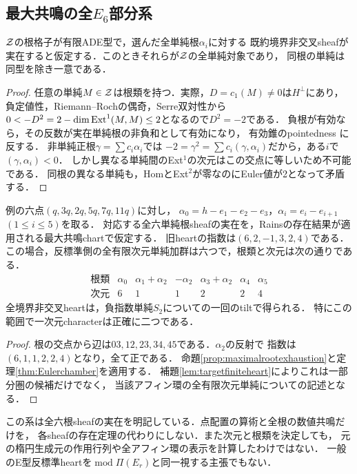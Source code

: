 \subsection{最大共鳴の全\texorpdfstring{$E_6$}{E6}部分系}
\begin{proposition}[全単純根が実在する場合の網羅性]\label{prop:maximalrootexhaustion}
$\mathcal Z$の根格子が有限ADE型で，選んだ全単純根$\alpha_i$に対する
既約境界非交叉sheafが実在すると仮定する．このときそれらが$\mathcal Z$の全単純対象であり，
同根の単純は同型を除き一意である．
\end{proposition}
\begin{proof}
任意の単純$M\in\mathcal Z$は根類を持つ．実際，$D=c_1(M)\ne0$は$H^\perp$にあり，
負定値性，Riemann--Rochの偶奇，Serre双対性から
$0<-D^2=2-\dim\operatorname{Ext}^1(M,M)\le2$となるので$D^2=-2$である．
負根が有効なら，その反数が実在単純根の非負和として有効になり，
有効錐のpointedness \cite[Proposition 7.19]{Rains}に反する．
非単純正根$\gamma=\sum c_i\alpha_i$では
$-2=\gamma^2=\sum c_i(\gamma,\alpha_i)$だから，ある$i$で$(\gamma,\alpha_i)<0$．
しかし異なる単純間のExt$^1$の次元はこの交点に等しいため不可能である．
同根の異なる単純も，HomとExt$^2$が零なのにEuler値が2となって矛盾する．
\end{proof}

\begin{corollary}[一つの反射による全六単純の決定]\label{cor:E6spectrum}
例の六点$(q,3q,2q,5q,7q,11q)$に対し，
$\alpha_0=h-e_1-e_2-e_3$，$\alpha_i=e_i-e_{i+1}$ $(1\le i\le5)$を取る．
対応する全六単純根sheafの実在を，Rainsの存在結果が適用される最大共鳴chartで仮定する．
旧heartの指数は$(6,2,-1,3,2,4)$である．
この場合，反標準側の全有限次元単純加群は六つで，根類と次元は次の通りである．
\[
\begin{array}{c|rrrrrr}
\text{根類}&\alpha_0&\alpha_1+\alpha_2&-\alpha_2&\alpha_3+\alpha_2&\alpha_4&\alpha_5\\\hline
\text{次元}&6&1&1&2&2&4
\end{array}
\]
全境界非交叉heartは，負指数単純$S_2$についての一回のtiltで得られる．
特にこの範囲で一次元characterは正確に二つである．
\end{corollary}
\begin{proof}
根の交点から辺は$03,12,23,34,45$である．$\alpha_2$の反射で
指数は$(6,1,1,2,2,4)$となり，全て正である．
命題\ref{prop:maximalrootexhaustion}と定理\ref{thm:Eulerchamber}を適用する．
補題\ref{lem:targetfiniteheart}によりこれは一部分圏の候補だけでなく，
当該アフィン環の全有限次元単純についての記述となる．
\end{proof}
\begin{remark}[実在条件と未計算の部分]
この系は全六根sheafの実在を明記している．点配置の算術と全根の数値共鳴だけを，
各sheafの存在定理の代わりにしない．また次元と根類を決定しても，
元の楕円生成元の作用行列や全アフィン環の表示を計算したわけではない．
一般のE型反標準heartを$\operatorname{mod}\Pi(E_r)$と同一視する主張でもない．
\end{remark}
